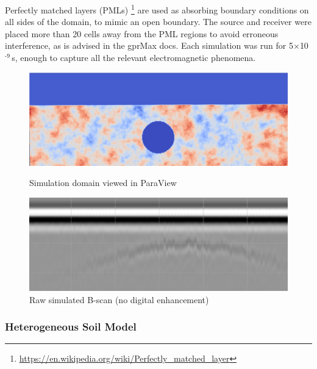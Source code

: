             \noindent Perfectly matched layers (PMLs) \footnote{\url{https://en.wikipedia.org/wiki/Perfectly_matched_layer}} are used as absorbing boundary conditions on all sides of the domain, to mimic an open boundary. The source and receiver were placed more than 20 cells away from the PML regions to avoid erroneous interference, as is advised in the gprMax docs. Each simulation was run for 5$\times$10$^{\text{-9}}$\,s, enough to capture all the relevant electromagnetic phenomena.
            \begin{figure}[htbp]
            \centering
            \begin{minipage}[b]{0.48\textwidth}
                \centering
                \includegraphics[width=\textwidth]{figs/Rory/radar_domain.pdf}
                \caption{Simulation domain viewed in ParaView }
                \label{fig:radar_domain}
            \end{minipage}
            \hfill
            \begin{minipage}[b]{0.48\textwidth}
                \centering
                \includegraphics[width=\textwidth]{figs/Rory/sim_bscan_cropped.png}
                \caption{Raw simulated B-scan (no digital enhancement)}
                \label{fig:original_bscan}
            \end{minipage}
        \end{figure}    
    \subsubsection{Heterogeneous Soil Model}
    
